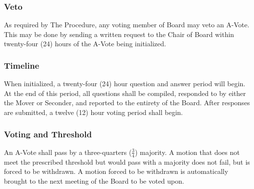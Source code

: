 \subsubsection{Veto}
As required by The Procedure, any voting member of Board may veto an A-Vote.
This may be done by sending a written request to the Chair of Board within twenty-four (24) hours of the A-Vote being initialized.

\subsubsection{Timeline}
When initialized, a twenty-four (24) hour question and answer period will begin.
At the end of this period, all questions shall be compiled, responded to by either the Mover or Seconder, and reported to the entirety of the Board.
After responses are submitted, a twelve (12) hour voting period shall begin.

\subsubsection{Voting and Threshold}
An A-Vote shall pass by a three-quarters ($\frac{3}{4}$) majority.
A motion that does not meet the prescribed threshold but would pass with a majority does not fail, but is forced to be withdrawn.
A motion forced to be withdrawn is automatically brought to the next meeting of the Board to be voted upon.